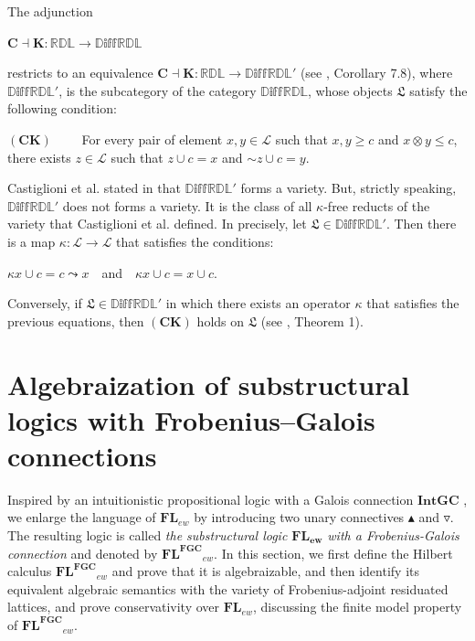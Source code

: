 \documentclass[final,12pt,times]{elsarticle}
\theoremstyle{plain}
\theoremstyle{definition}
\theoremstyle{break}
\begin{document}
The adjunction
\begin{center} $\mathbf{C}\dashv \mathbf{K}:\mathbb{RDL}\rightarrow \mathbb{D\text{iff}RDL}$
 \end{center}
restricts to an equivalence $\mathbf{C}\dashv \mathbf{K}:\mathbb{RDL}\rightarrow \mathbb{D\text{iff}RDL'}$ (see \cite{Castiglionib}, Corollary 7.8),
where $\mathbb{D\text{iff}RDL'}$, is the subcategory of the category $\mathbb{D\text{iff}RDL}$, whose objects $\boldsymbol{\mathfrak{L}}$ satisfy the following condition:
\begin{center} $(\mathbf{CK})$ \ ~~~For every pair of element $x,y\in \mathcal{L}$ such that $x,y\geq c$ and $x\otimes y\leq c$, there exists $z\in \mathcal{L}$ such that $z\cup c=x$ and ${\sim}z\cup c=y$.
\end{center}

Castiglioni et al. stated in \cite{Castiglionic} that $\mathbb{D\text{iff}RDL'}$ forms a variety. But, strictly speaking, $\mathbb{D\text{iff}RDL'}$ does not forms a variety. It is the class of all $\kappa$-free reducts of the variety that Castiglioni et al. defined. In precisely, let $\boldsymbol{\mathfrak{L}}\in \mathbb{D\text{iff}RDL'}$. Then there is a map $\kappa:\mathcal{L}\rightarrow \mathcal{L}$ that satisfies the conditions:

\begin{center}

$\kappa x\cup c=c\leadsto x$~~and~~$\kappa x\cup c=x\cup c$.
\end{center}

Conversely, if $\boldsymbol{\mathfrak{L}} \in \mathbb{D\text{iff}RDL'}$ in which there exists an operator $\kappa$ that satisfies the previous equations, then $(\mathbf{CK})$ holds on $\boldsymbol{\mathfrak{L}}$ (see \cite{Castiglionic}, Theorem 1).

\section{Algebraization of substructural logics with Frobenius--Galois connections}\label{section:algebraization-FGC}
\label{section3}

Inspired by an intuitionistic propositional logic with a Galois connection $\mathbf{IntGC}$ \cite{DzikJarvinenKondo2010}, we enlarge the language of $\mathbf{FL}_{ew}$ by introducing two unary connectives $\blacktriangle$ and $\triangledown$. The resulting logic is called  \emph{the substructural logic $\mathbf{FL_{ew}}$ with a Frobenius-Galois connection} and denoted by $\mathbf{FL^{FGC}}_{ew}$. In this section, we first define the Hilbert calculus $\mathbf{FL^{FGC}}_{ew}$ and prove that it is algebraizable, and then identify its equivalent algebraic semantics with the variety of Frobenius-adjoint residuated lattices, and prove conservativity over $\mathbf{FL}_{ew}$, discussing the finite model property of $\mathbf{FL^{FGC}}_{ew}$.
\end{document}
